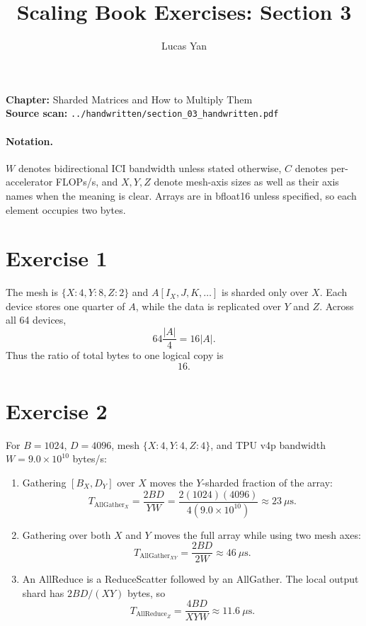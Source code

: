 \documentclass[11pt]{article}
\title{Scaling Book Exercises: Section 3}
\author{Lucas Yan}
\date{}
\newcommand{\AG}{\operatorname{AllGather}}
\newcommand{\AR}{\operatorname{AllReduce}}
\begin{document}
\maketitle

\noindent
\textbf{Chapter:} Sharded Matrices and How to Multiply Them\\
\textbf{Source scan:} \texttt{../handwritten/section\_03\_handwritten.pdf}

\paragraph{Notation.}
$W$ denotes bidirectional ICI bandwidth unless stated otherwise, $C$ denotes
per-accelerator FLOPs/s, and $X,Y,Z$ denote mesh-axis sizes as well as their
axis names when the meaning is clear. Arrays are in bfloat16 unless specified,
so each element occupies two bytes.

\section*{Exercise 1}

The mesh is $\{X:4,Y:8,Z:2\}$ and $A[I_X,J,K,\ldots]$ is sharded only over
$X$. Each device stores one quarter of $A$, while the data is replicated over
$Y$ and $Z$. Across all 64 devices,
\[
64\frac{|A|}{4}=16|A|.
\]
Thus the ratio of total bytes to one logical copy is
\[
\boxed{16}.
\]

\section*{Exercise 2}

For $B=1024$, $D=4096$, mesh $\{X:4,Y:4,Z:4\}$, and TPU v4p bandwidth
$W=9.0\times10^{10}$ bytes/s:

\begin{enumerate}[label=(\alph*)]
\item Gathering $[B_X,D_Y]$ over $X$ moves the $Y$-sharded fraction of the
array:
\[
T_{\AG_X}=\frac{2BD}{YW}
=\frac{2(1024)(4096)}{4(9.0\times10^{10})}
\approx\boxed{23\ \mu\mathrm{s}}.
\]

\item Gathering over both $X$ and $Y$ moves the full array while using two
mesh axes:
\[
T_{\AG_{XY}}=\frac{2BD}{2W}
\approx\boxed{46\ \mu\mathrm{s}}.
\]

\item An AllReduce is a ReduceScatter followed by an AllGather. The local
output shard has $2BD/(XY)$ bytes, so
\[
T_{\AR_Z}=\frac{4BD}{XYW}
\approx\boxed{11.6\ \mu\mathrm{s}}.
\]
\end{enumerate}
\end{document}
